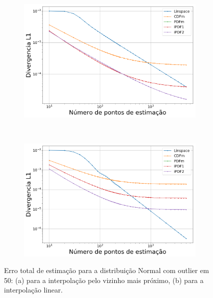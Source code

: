 \begin{figure}[H]
	\centering
	\begin{subfigure}[b]{0.45\textwidth}
		\centering 
		\includegraphics[width=\textwidth]{./figuras/ERRORPLOT_L1_TRUE_NORMAL_NEAREST_050_log}
		\caption{}
		\label{fig:error_norm_near_50}
	\end{subfigure}
	\hfill
	~ %
	\begin{subfigure}[b]{0.45\textwidth}
		\centering 
		\includegraphics[width=\textwidth]{./figuras/ERRORPLOT_L1_TRUE_NORMAL_LINEAR_050_log}
		\caption{}
		\label{fig:error_norm_lin_50}
	\end{subfigure}
\caption{Erro total de estimação para a distribuição Normal com outlier em 50: (a) para a interpolação pelo vizinho mais próximo, (b) para a interpolação linear.}
\label{fig:Error_out}
\end{figure}